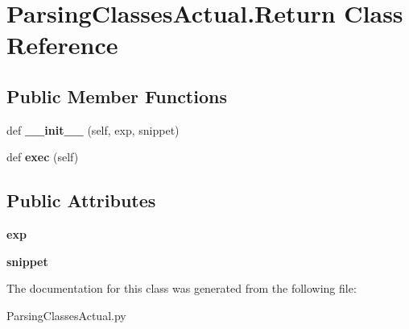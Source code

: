 \hypertarget{class_parsing_classes_actual_1_1_return}{}\section{Parsing\+Classes\+Actual.\+Return Class Reference}
\label{class_parsing_classes_actual_1_1_return}
\subsection*{Public Member Functions}
\begin{DoxyCompactItemize}
\item 
\mbox{\label{class_parsing_classes_actual_1_1_return_af8d6700c68272fc7a9f66befd743e547}} 
def {\bfseries \+\_\+\+\_\+init\+\_\+\+\_\+} (self, exp, snippet)
\item 
\mbox{\label{class_parsing_classes_actual_1_1_return_a0abe605098c54c3c29e865a40efb58ce}} 
def {\bfseries exec} (self)
\end{DoxyCompactItemize}
\subsection*{Public Attributes}
\begin{DoxyCompactItemize}
\item 
\mbox{\label{class_parsing_classes_actual_1_1_return_a49d43bb82d1a79d3f181dbc8cf159f09}} 
{\bfseries exp}
\item 
\mbox{\label{class_parsing_classes_actual_1_1_return_af4603fca7bfda265c24ce85e21f1c21a}} 
{\bfseries snippet}
\end{DoxyCompactItemize}


The documentation for this class was generated from the following file\+:\begin{DoxyCompactItemize}
\item 
Parsing\+Classes\+Actual.\+py\end{DoxyCompactItemize}
